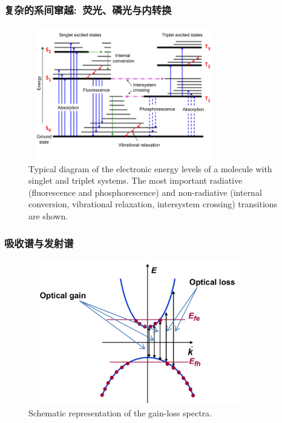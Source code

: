 \frame
{
	\frametitle{复杂的系间窜越:~荧光、磷光与内转换}
\begin{figure}[h!]
\centering
\vspace*{-0.05in}
\includegraphics[height=2.3in,width=3.3in,viewport=0 0 720 520,clip]{Figures/Typical-diagram-of-the-electronic-energy-levels-of-a-molecule-with-singlet-and-triplet.png}
\caption{\fontsize{5.2pt}{4.0pt}\selectfont\textrm{Typical diagram of the electronic energy levels of a molecule with singlet and triplet  systems. The most important radiative (fluorescence and phosphorescence) and non-radiative (internal conversion, vibrational relaxation, intersystem crossing) transitions are shown.}}%
\label{singlet-triplet}
\end{figure} 
}

\frame
{
	\frametitle{吸收谱与发射谱}
\begin{figure}[h!]
\centering
\vspace*{-0.19in}
\includegraphics[height=2.5in,width=3.80in,viewport=0 0 950 700,clip]{Figures/Optical_gain-loss.png}
\caption{\fontsize{5.2pt}{4.0pt}\selectfont\textrm{Schematic representation of the gain-loss spectra.}}%
\label{gain-loss_Bandgap}
\end{figure} 
}

